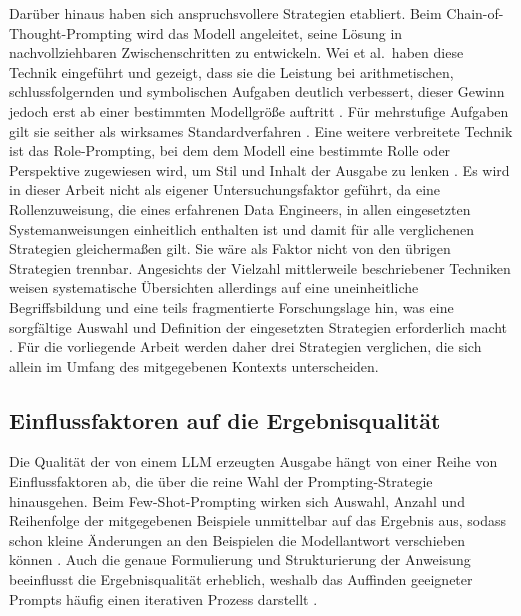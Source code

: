 Darüber hinaus haben sich anspruchsvollere Strategien etabliert. Beim Chain-of-Thought-Prompting wird das Modell angeleitet, seine Lösung in nachvollziehbaren Zwischenschritten zu entwickeln. Wei et al.\ haben diese Technik eingeführt und gezeigt, dass sie die Leistung bei arithmetischen, schlussfolgernden und symbolischen Aufgaben deutlich verbessert, dieser Gewinn jedoch erst ab einer bestimmten Modellgröße auftritt \autocite{weiChainOfThought2022}. Für mehrstufige Aufgaben gilt sie seither als wirksames Standardverfahren \autocite{sahooSystematicSurveyPrompt}. Eine weitere verbreitete Technik ist das Role-Prompting, bei dem dem Modell eine bestimmte Rolle oder Perspektive zugewiesen wird, um Stil und Inhalt der Ausgabe zu lenken \autocite{schulhoffPromptReportSystematic2025,sahooSystematicSurveyPrompt}. Es wird in dieser Arbeit nicht als eigener Untersuchungsfaktor geführt, da eine Rollenzuweisung, die eines erfahrenen Data Engineers, in allen eingesetzten Systemanweisungen einheitlich enthalten ist und damit für alle verglichenen Strategien gleichermaßen gilt. Sie wäre als Faktor nicht von den übrigen Strategien trennbar. Angesichts der Vielzahl mittlerweile beschriebener Techniken weisen systematische Übersichten allerdings auf eine uneinheitliche Begriffsbildung und eine teils fragmentierte Forschungslage hin, was eine sorgfältige Auswahl und Definition der eingesetzten Strategien erforderlich macht \autocite{schulhoffPromptReportSystematic2025,sahooSystematicSurveyPrompt}. Für die vorliegende Arbeit werden daher drei Strategien verglichen, die sich allein im Umfang des mitgegebenen Kontexts unterscheiden.

\subsection{Einflussfaktoren auf die Ergebnisqualität}
\label{subsec:prompting-einfluss}

Die Qualität der von einem \ac{LLM} erzeugten Ausgabe hängt von einer Reihe von Einflussfaktoren ab, die über die reine Wahl der Prompting-Strategie hinausgehen. Beim Few-Shot-Prompting wirken sich Auswahl, Anzahl und Reihenfolge der mitgegebenen Beispiele unmittelbar auf das Ergebnis aus, sodass schon kleine Änderungen an den Beispielen die Modellantwort verschieben können \autocite{schulhoffPromptReportSystematic2025,liuPretrainPromptPredict2023}. Auch die genaue Formulierung und Strukturierung der Anweisung beeinflusst die Ergebnisqualität erheblich, weshalb das Auffinden geeigneter Prompts häufig einen iterativen Prozess darstellt \autocite{sahooSystematicSurveyPrompt,changEfficientPromptingMethods2024}.

